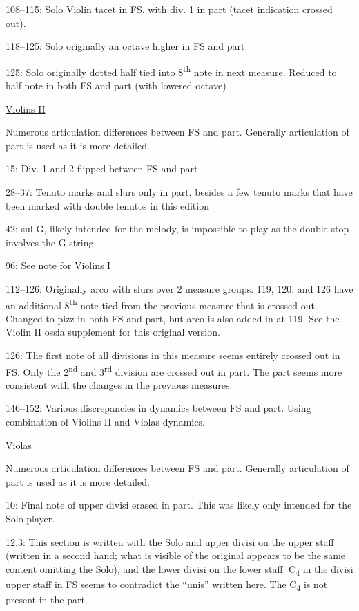\documentclass[twoside]{article}
\begin{document}
\begin{hangparas}{15pt}{1}
\begin{multicols}{2}
108--115: Solo Violin tacet in FS, with div. 1 in part (tacet indication crossed out).

118--125: Solo originally an octave higher in FS and part

125: Solo originally dotted half tied into 8\textsuperscript{th} note in next measure. Reduced to half note in both FS and part (with lowered octave)

\underline{Violins II}

Numerous articulation differences between FS and part. Generally articulation of part is used as it is more detailed.

15: Div. 1 and 2 flipped between FS and part

28--37: Tenuto marks and slurs only in part, besides a few tenuto marks that have been marked with double tenutos in this edition

42: sul G, likely intended for the melody, is impossible to play as the double stop involves the G string.

96: See note for Violins I

112--126: Originally arco with slurs over 2 measure groups. 119, 120, and 126 have an additional 8\textsuperscript{th} note tied from the previous measure that is crossed out. Changed to pizz in both FS and part, but arco is also added in at 119. See the Violin II ossia supplement for this original version.

126: The first note of all divisions in this measure seems entirely crossed out in FS. Only the 2\textsuperscript{nd} and 3\textsuperscript{rd} division are crossed out in part. The part seems more consistent with the changes in the previous measures.

146--152: Various discrepancies in dynamics between FS and part. Using combination of Violins II and Violas dynamics.

\underline{Violas}

Numerous articulation differences between FS and part. Generally articulation of part is used as it is more detailed.

10: Final note of upper divisi erased in part. This was likely only intended for the Solo player.

12.3: This section is written with the Solo and upper divisi on the upper staff (written in a second hand; what is visible of the original appears to be the same content omitting the Solo), and the lower divisi on the lower staff. C\textsubscript{4} in the divisi upper staff in FS seems to contradict the ``unis'' written here. The C\textsubscript{4} is not present in the part.


\end{multicols}
\end{hangparas}
\end{document}
